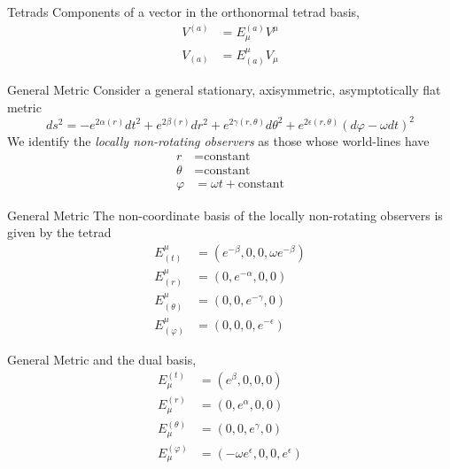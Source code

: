 \documentclass{beamer}
\begin{document}
\begin{darkframes}
\begin{frame}{Tetrads}
	Components of a vector in the orthonormal tetrad basis,
	\pause
	\begin{align*}
	V^{(a)} &= E^{(a)}_\mu V^\mu \\
	V_{(a)} &= E_{(a)}^\mu V_\mu
	\end{align*}
\end{frame}

\begin{frame}{General Metric}
	Consider a general stationary, axisymmetric, asymptotically flat metric
	\[ ds^2 = -e^{2\alpha(r)}dt^2 + e^{2\beta(r)} dr^2 + e^{2\gamma(r,\theta)} d\theta^2 + e^{2\epsilon(r,\theta)} (d\varphi-\omega dt)^2\] 
	\pause
	We identify the \textit{locally non-rotating observers} as those whose world-lines have 
	\pause
	\begin{align*}
	r &= \textrm{constant} \\
	\theta &= \textrm{constant}\\
	\varphi &= \omega t+\textrm{constant}
	\end{align*}
\end{frame}

\begin{frame}{General Metric}
	The non-coordinate basis of the locally non-rotating observers is given by the tetrad
	\begin{align*}
	E^\mu _{(t)} &= \left( e^{-\beta}, 0, 0, \omega e^{-\beta} \right)\\
	E^\mu _{(r)} &= \left( 0, e^{-\alpha}, 0, 0 \right)\\
	E^\mu _{(\theta )} &= \left( 0, 0, e^{-\gamma}, 0 \right)\\
	E^\mu _{(\varphi )} &= \left( 0, 0, 0, e^{-\epsilon} \right)
	\end{align*}
\end{frame}

\begin{frame}{General Metric}
	and the dual basis,	
	\begin{align*}
	E_\mu ^{(t)} &= \left( e^{\beta}, 0, 0, 0 \right)\\
	E_\mu ^{(r)} &= \left( 0, e^{\alpha}, 0, 0 \right)\\
	E_\mu ^{(\theta )} &= \left( 0, 0, e^{\gamma}, 0 \right)\\
	E_\mu ^{(\varphi )} &= \left( -\omega e^{\epsilon}, 0, 0, e^{\epsilon} \right)
	\end{align*}
\end{frame}


\end{darkframes}
\end{document}
